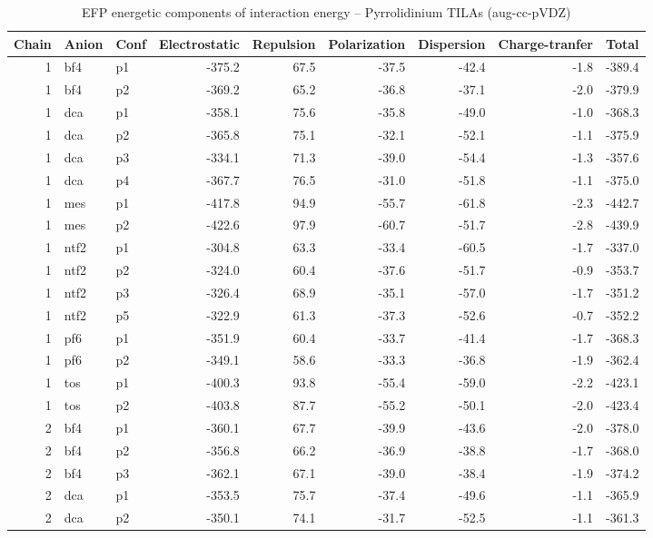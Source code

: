 \documentclass[a4paper]{article}
\begin{document}
\begin{table}[ht]
\centering
\footnotesize
\scriptsize
\caption{EFP energetic components of interaction energy -- Pyrrolidinium TILAs (aug-cc-pVDZ)}
\begin{tabular}{rllrrrrrr}
  \hline
Chain & Anion & Conf & Electrostatic & Repulsion & Polarization & Dispersion & Charge-tranfer & Total \\ 
  \hline
 1 & bf4 & p1 & -375.2 & 67.5 & -37.5 & -42.4 & -1.8 & -389.4 \\ 
   1 & bf4 & p2 & -369.2 & 65.2 & -36.8 & -37.1 & -2.0 & -379.9 \\ 
   1 & dca & p1 & -358.1 & 75.6 & -35.8 & -49.0 & -1.0 & -368.3 \\ 
   1 & dca & p2 & -365.8 & 75.1 & -32.1 & -52.1 & -1.1 & -375.9 \\ 
   1 & dca & p3 & -334.1 & 71.3 & -39.0 & -54.4 & -1.3 & -357.6 \\ 
   1 & dca & p4 & -367.7 & 76.5 & -31.0 & -51.8 & -1.1 & -375.0 \\ 
   1 & mes & p1 & -417.8 & 94.9 & -55.7 & -61.8 & -2.3 & -442.7 \\ 
   1 & mes & p2 & -422.6 & 97.9 & -60.7 & -51.7 & -2.8 & -439.9 \\ 
   1 & ntf2 & p1 & -304.8 & 63.3 & -33.4 & -60.5 & -1.7 & -337.0 \\ 
   1 & ntf2 & p2 & -324.0 & 60.4 & -37.6 & -51.7 & -0.9 & -353.7 \\ 
   1 & ntf2 & p3 & -326.4 & 68.9 & -35.1 & -57.0 & -1.7 & -351.2 \\ 
   1 & ntf2 & p5 & -322.9 & 61.3 & -37.3 & -52.6 & -0.7 & -352.2 \\ 
   1 & pf6 & p1 & -351.9 & 60.4 & -33.7 & -41.4 & -1.7 & -368.3 \\ 
   1 & pf6 & p2 & -349.1 & 58.6 & -33.3 & -36.8 & -1.9 & -362.4 \\ 
   1 & tos & p1 & -400.3 & 93.8 & -55.4 & -59.0 & -2.2 & -423.1 \\ 
   1 & tos & p2 & -403.8 & 87.7 & -55.2 & -50.1 & -2.0 & -423.4 \\ 
   2 & bf4 & p1 & -360.1 & 67.7 & -39.9 & -43.6 & -2.0 & -378.0 \\ 
   2 & bf4 & p2 & -356.8 & 66.2 & -36.9 & -38.8 & -1.7 & -368.0 \\ 
   2 & bf4 & p3 & -362.1 & 67.1 & -39.0 & -38.4 & -1.9 & -374.2 \\ 
   2 & dca & p1 & -353.5 & 75.7 & -37.4 & -49.6 & -1.1 & -365.9 \\ 
   2 & dca & p2 & -350.1 & 74.1 & -31.7 & -52.5 & -1.1 & -361.3 \\ 

\end{tabular}
\end{table}
\end{document}
